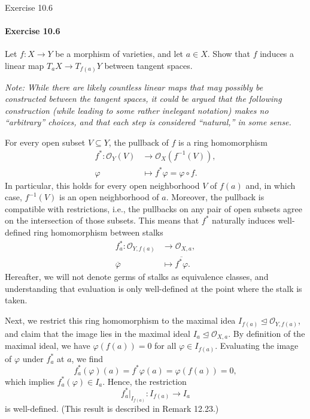 \documentclass[12pt]{article}
\newenvironment{fullbox}{\begin{lrbox}{\savefullbox}\begin{minipage}{\dimexpr\textwidth-2\fboxsep\relax}}{\end{minipage}\end{lrbox}\begin{center}\framebox[\textwidth]{\usebox{\savefullbox}}\end{center}}
\newenvironment{pbox}[1][]{\begin{fullbox}\ifx#1\empty\else\paragraph{#1}\fi}{\end{fullbox}}
\renewcommand{\phi}{\varphi}
\newcommand{\<}{\langle}
\renewcommand{\>}{\rangle}
\newcommand{\eqc}{\overline}
\renewcommand{\O}{\mathscr{O}}
\newcommand{\teq}{\trianglelefteq}
\begin{document}
\thispagestyle{title}

\begin{pbox}[Exercise 10.6]
    Let $f : X \to Y$ be a morphism of varieties, and let $a \in X$. Show that $f$ induces a linear map $T_aX \to T_{f(a)}Y$ between tangent spaces.
\end{pbox}

\textit{Note: While there are likely countless linear maps that may possibly be constructed between the tangent spaces, it could be argued that the following construction (while leading to some rather inelegant notation) makes no ``arbitrary'' choices, and that each step is considered ``natural,'' in some sense.}


For every open subset $V \subseteq Y$, the pullback of $f$ is a ring homomorphism
\begin{align*}
    f^* : \O_Y(V) &\to \O_X(f^{-1}(V)), \\
        \phi &\mapsto f^*\phi = \phi \circ f.
\end{align*}
In particular, this holds for every open neighborhood $V$ of $f(a)$ and, in which case, $f^{-1}(V)$ is an open neighborhood of $a$. Moreover, the pullback is compatible with restrictions, i.e., the pullbacks on any pair of open subsets agree on the intersection of those subsets. This means that $f^*$ naturally induces well-defined ring homomorphism between stalks
\begin{align*}
    f^*_a : \O_{Y, f(a)} &\to \O_{X, a}, \\
        \eqc{\phi} &\mapsto \eqc{f^*\phi}.
\end{align*}
Hereafter, we will not denote germs of stalks as equivalence classes, and understanding that evaluation is only well-defined at the point where the stalk is taken.

Next, we restrict this ring homomorphism to the maximal idea $I_{f(a)} \teq \O_{Y, f(a)}$, and claim that the image lies in the maximal ideal $I_a \teq \O_{X, a}$. By definition of the maximal ideal, we have $\phi(f(a)) = 0$ for all $\phi \in I_{f(a)}$. Evaluating the image of $\phi$ under $f^*_a$ at $a$, we find
\[
    f^*_a(\phi)(a) = f^*\phi(a) = \phi(f(a)) = 0,
\]
which implies $f^*_a(\phi) \in I_a$. Hence, the restriction
\[
    f^*_a|_{I_{f(a)}} : I_{f(a)} \to I_a
\]
is well-defined. (This result is described in Remark 12.23.)
\end{document}

